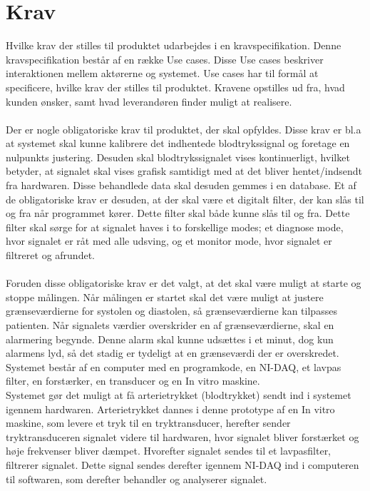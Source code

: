 \chapter{Krav}
Hvilke krav der stilles til produktet udarbejdes i en kravspecifikation. Denne kravspecifikation består af en række Use cases. Disse Use cases beskriver interaktionen mellem aktørerne og systemet. Use cases har til formål at specificere, hvilke krav der stilles til produktet. Kravene opstilles ud fra, hvad kunden ønsker, samt hvad leverandøren finder muligt at realisere. \\ \\
Der er nogle obligatoriske krav til produktet, der skal opfyldes. Disse krav er bl.a at systemet skal kunne kalibrere det indhentede blodtrykssignal og foretage en nulpunkts justering. Desuden skal blodtrykssignalet vises kontinuerligt, hvilket betyder, at signalet skal vises grafisk samtidigt med at det bliver hentet/indsendt fra hardwaren. Disse behandlede data skal desuden gemmes i en database.
Et af de obligatoriske krav er desuden, at der skal være et digitalt filter, der kan slås til og fra når programmet kører. Dette filter skal både kunne slås til og fra. Dette filter skal sørge for at signalet haves i to forskellige modes; et diagnose mode, hvor signalet er råt med alle udsving, og et monitor mode, hvor signalet er filtreret og afrundet.\\\\
Foruden disse obligatoriske krav er det valgt, at det skal være muligt at starte og stoppe målingen. Når målingen er startet skal det være muligt at justere grænseværdierne for systolen og diastolen, så grænseværdierne kan tilpasses patienten. Når signalets værdier overskrider en af grænseværdierne, skal en alarmering begynde. Denne alarm skal kunne udsættes i et minut, dog kun alarmens lyd, så det stadig er tydeligt at en grænseværdi der er overskredet.\\
Systemet består af en computer med en programkode, en NI-DAQ, et lavpas filter, en forstærker, en transducer og en In vitro maskine.\\
Systemet gør det muligt at få arterietrykket (blodtrykket) sendt ind i systemet igennem hardwaren. Arterietrykket dannes i denne prototype af en In vitro maskine, som levere et tryk til en tryktransducer, herefter sender tryktransduceren signalet videre til hardwaren, hvor signalet bliver forstærket og høje frekvenser bliver dæmpet. Hvorefter signalet sendes til et lavpasfilter, filtrerer signalet. Dette signal sendes derefter igennem NI-DAQ ind i computeren til softwaren, som derefter behandler og analyserer signalet.\\
